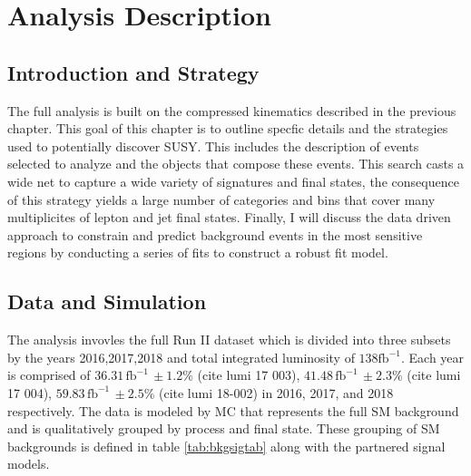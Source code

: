 
\setcounter{secnumdepth}{3}
\setcounter{tocdepth}{3}
\setlength{\parskip}{\smallskipamount}
\setlength{\parindent}{0pt}


\makeatletter


\providecommand{\tabularnewline}{\\}


\makeatother

%

\chapter{Analysis Description }

\section{Introduction and Strategy}
The full analysis is built on the compressed kinematics described in the previous chapter. This goal of this chapter is to outline specfic details and the strategies used to potentially discover SUSY. This includes the description of events selected to analyze and the objects that compose these events. This search casts a wide net to capture a wide variety of signatures and final states, the consequence of this strategy yields a large number of categories and bins that cover many multiplicites of lepton and jet final states. Finally, I will discuss the data driven approach to constrain and predict background events in the most sensitive regions by conducting a series of fits to construct a robust fit model.


\section{ Data and Simulation}
The analysis invovles the full Run II dataset which is divided into three subsets by the years 2016,2017,2018 and total integrated luminosity of $138 \text{fb}^{-1}$. Each year is comprised of $36.31 \, \text{fb}^{-1} \, \pm 1.2\%$ (cite lumi 17 003), $41.48 \, \text{fb}^{-1} \, \pm 2.3\%$ (cite lumi 17 004), $59.83 \, \text{fb}^{-1} \, \pm2.5\%$ (cite lumi 18-002) in 2016, 2017, and 2018 respectively. The data is modeled by MC that represents the full SM background and is qualitatively grouped by process and final state. These grouping of SM backgrounds is defined in table \ref{tab:bkgsigtab} along with the partnered signal models.


